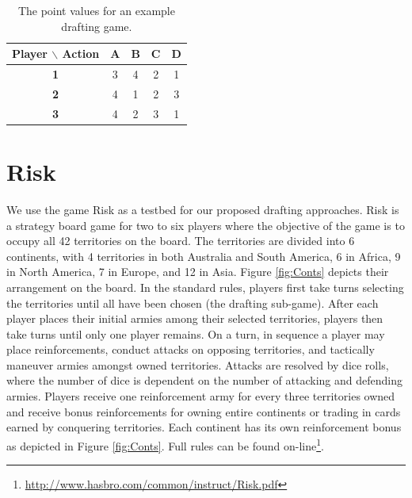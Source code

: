 \documentclass[letterpaper]{article}
\numberwithin{equation}{section}
\numberwithin{theorem}{section}
\numberwithin{lemma}{section}
\numberwithin{df}{section}
\begin{document}
\begin{table}[t]
	\begin{center}
		\caption{The point values for an example drafting game.}
		\label{tab:KthEx}
		\begin{tabular}{|c|c|c|c|c|}
			\hline
			\bf Player $\backslash$ Action & \bf A & \bf B & \bf C & \bf D \\
			\hline
			\bf 1 & 3 & 4 & 2 & 1 \\
			\hline
			\bf 2 & 4 & 1 & 2 & 3 \\
			\hline
			\bf 3 & 4 & 2 & 3 & 1 \\
			\hline
		\end{tabular}
	\end{center}
\end{table}

%

\section{Risk}

We use the game Risk as a testbed for our proposed drafting approaches.  Risk is a strategy board game for two to six players where the objective of the game is to occupy all 42 territories on the board.  The territories are divided into 6 continents, with 4 territories in both Australia and South America, 6 in Africa, 9 in North America, 7 in Europe, and 12 in Asia.  Figure \ref{fig:Conts} depicts their arrangement on the board.  In the standard rules, players first take turns selecting the territories until all have been chosen (the drafting sub-game).  After each player places their initial armies among their selected territories, players then take turns until only one player remains.  On a turn, in sequence a player may place reinforcements, conduct attacks on opposing territories, and tactically maneuver armies amongst owned territories.  Attacks are resolved by dice rolls, where the number of dice is dependent on the number of attacking and defending armies.  Players receive one reinforcement army for every three territories owned and receive bonus reinforcements for owning entire continents or trading in cards earned by conquering territories.  Each continent has its own reinforcement bonus as depicted in Figure \ref{fig:Conts}.  Full rules can be found on-line\footnote{\url{http://www.hasbro.com/common/instruct/Risk.pdf}}.
\end{document}
